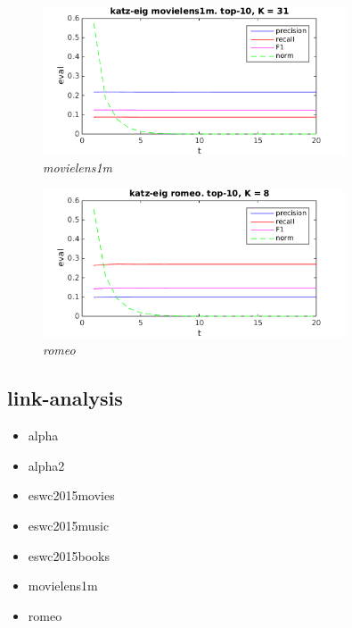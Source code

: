 \begin{figure}[h!]
  \centering
    \includegraphics[width=0.8\textwidth]{fig/katzeig_t/movielens_katzeig_t.png}
    \caption{\textit{movielens1m}}
\end{figure}

\begin{figure}[h!]
  \centering
    \includegraphics[width=0.8\textwidth]{fig/katzeig_t/romeo_katzeig_t.png}
    \caption{\textit{romeo}}
\end{figure}

\FloatBarrier


\subsection{link-analysis}

\begin{itemize}
    \item alpha
    \item alpha2
    \item eswc2015movies
    \item eswc2015music
    \item eswc2015books
    \item movielens1m
    \item romeo
\end{itemize}



